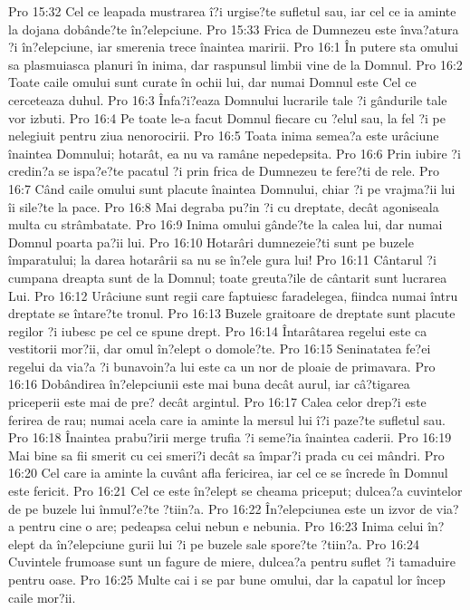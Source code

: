 Pro 15:32  Cel ce leapada mustrarea î?i urgise?te sufletul sau, iar cel ce ia aminte la dojana dobânde?te în?elepciune.
Pro 15:33  Frica de Dumnezeu este înva?atura ?i în?elepciune, iar smerenia trece înaintea maririi.
Pro 16:1  În putere sta omului sa plasmuiasca planuri în inima, dar raspunsul limbii vine de la Domnul.
Pro 16:2  Toate caile omului sunt curate în ochii lui, dar numai Domnul este Cel ce cerceteaza duhul.
Pro 16:3  Înfa?i?eaza Domnului lucrarile tale ?i gândurile tale vor izbuti.
Pro 16:4  Pe toate le-a facut Domnul fiecare cu ?elul sau, la fel ?i pe nelegiuit pentru ziua nenorocirii.
Pro 16:5  Toata inima semea?a este urâciune înaintea Domnului; hotarât, ea nu va ramâne nepedepsita.
Pro 16:6  Prin iubire ?i credin?a se ispa?e?te pacatul ?i prin frica de Dumnezeu te fere?ti de rele.
Pro 16:7  Când caile omului sunt placute înaintea Domnului, chiar ?i pe vrajma?ii lui îi sile?te la pace.
Pro 16:8  Mai degraba pu?in ?i cu dreptate, decât agoniseala multa cu strâmbatate.
Pro 16:9  Inima omului gânde?te la calea lui, dar numai Domnul poarta pa?ii lui.
Pro 16:10  Hotarâri dumnezeie?ti sunt pe buzele împaratului; la darea hotarârii sa nu se în?ele gura lui!
Pro 16:11  Cântarul ?i cumpana dreapta sunt de la Domnul; toate greuta?ile de cântarit sunt lucrarea Lui.
Pro 16:12  Urâciune sunt regii care faptuiesc faradelegea, fiindca numai întru dreptate se întare?te tronul.
Pro 16:13  Buzele graitoare de dreptate sunt placute regilor ?i iubesc pe cel ce spune drept.
Pro 16:14  Întarâtarea regelui este ca vestitorii mor?ii, dar omul în?elept o domole?te.
Pro 16:15  Seninatatea fe?ei regelui da via?a ?i bunavoin?a lui este ca un nor de ploaie de primavara.
Pro 16:16  Dobândirea în?elepciunii este mai buna decât aurul, iar câ?tigarea priceperii este mai de pre? decât argintul.
Pro 16:17  Calea celor drep?i este ferirea de rau; numai acela care ia aminte la mersul lui î?i paze?te sufletul sau.
Pro 16:18  Înaintea prabu?irii merge trufia ?i seme?ia înaintea caderii.
Pro 16:19  Mai bine sa fii smerit cu cei smeri?i decât sa împar?i prada cu cei mândri.
Pro 16:20  Cel care ia aminte la cuvânt afla fericirea, iar cel ce se încrede în Domnul este fericit.
Pro 16:21  Cel ce este în?elept se cheama priceput; dulcea?a cuvintelor de pe buzele lui înmul?e?te ?tiin?a.
Pro 16:22  În?elepciunea este un izvor de via?a pentru cine o are; pedeapsa celui nebun e nebunia.
Pro 16:23  Inima celui în?elept da în?elepciune gurii lui ?i pe buzele sale spore?te ?tiin?a.
Pro 16:24  Cuvintele frumoase sunt un fagure de miere, dulcea?a pentru suflet ?i tamaduire pentru oase.
Pro 16:25  Multe cai i se par bune omului, dar la capatul lor încep caile mor?ii.
